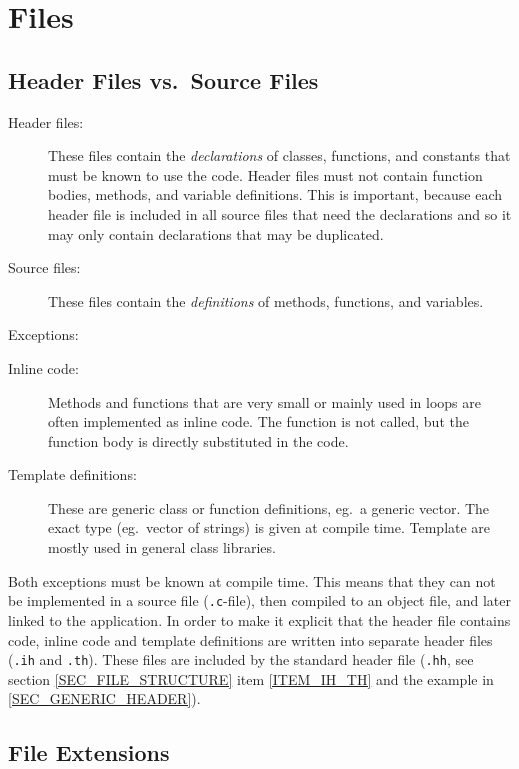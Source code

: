 
\section{Files}


\subsection{Header Files vs.\ Source Files}

\begin{description}
\item[Header files:]
  These files contain the {\em declarations} of
  classes, functions, and constants that must be known to use the code. Header
  files must not contain function bodies, methods, and variable
  definitions. This is important, because each header file is included in
  all source files that need the declarations and so it may only contain
  declarations that may be duplicated.
\item[Source files:]
  These files contain the {\em definitions} of
  methods, functions, and variables.
\end{description}

Exceptions: 

\begin{description}
\item[Inline code:]
  Methods and functions that are very small or
  mainly used in loops are often implemented as inline code. The function is
  not called, but the function body is directly substituted in
  the code.
\item[Template definitions:]
  These are generic class or function
  definitions, eg.\ a generic vector. The exact type (eg.\ vector of strings)
  is given at compile time. Template are mostly used in general class
  libraries.
\end{description}

Both exceptions must be known at compile time. This means that they can not be
implemented in a source file ({\tt .c}-file), then compiled to an object
file, and later linked to the application. In order to make it explicit that
the header file contains code, inline code and template definitions are
written into separate header files ({\tt .ih} and {\tt .th}). These
files are included by the standard header file ({\tt .hh}, see section
\ref{SEC_FILE_STRUCTURE} item \ref{ITEM_IH_TH} and the example in
\ref{SEC_GENERIC_HEADER}).


\subsection{File Extensions}


